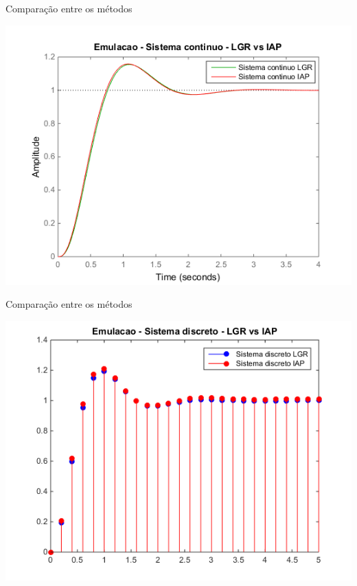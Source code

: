 \begin{frame}{Comparação entre os métodos}
\centerline{\includegraphics[width=0.8\linewidth]{Figuras/Ch10/fig7.png}}
\end{frame}

\begin{frame}{Comparação entre os métodos}
\centerline{\includegraphics[width=0.8\linewidth]{Figuras/Ch10/fig8.png}}
\end{frame}

